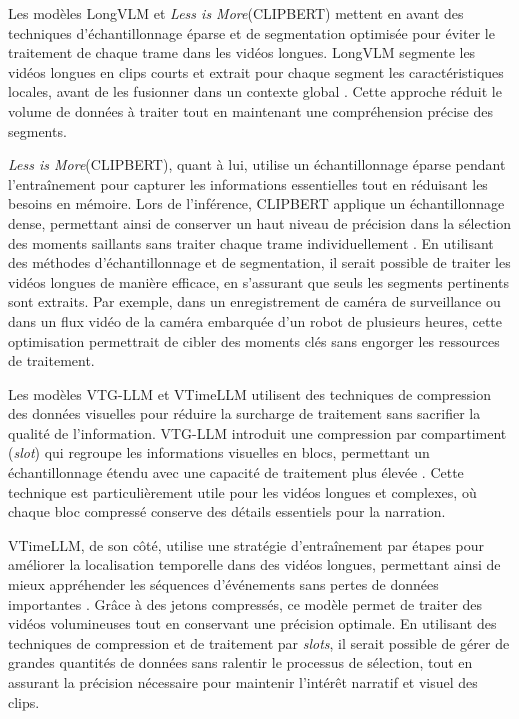 Les modèles LongVLM \cite{weng2024} et \textit{Less is More}(CLIPBERT) \cite{lei2021_clipbert} mettent en avant des techniques d’échantillonnage éparse et de segmentation optimisée pour éviter le traitement de chaque trame dans les vidéos longues. LongVLM segmente les vidéos longues en clips courts et extrait pour chaque segment les caractéristiques locales, avant de les fusionner dans un contexte global \cite{weng2024}. Cette approche réduit le volume de données à traiter tout en maintenant une compréhension précise des segments.

\textit{Less is More}(CLIPBERT), quant à lui, utilise un échantillonnage éparse pendant l’entraînement pour capturer les informations essentielles tout en réduisant les besoins en mémoire. Lors de l’inférence, CLIPBERT applique un échantillonnage dense, permettant ainsi de conserver un haut niveau de précision dans la sélection des moments saillants sans traiter chaque trame individuellement \cite{lei2021_clipbert}. En utilisant des méthodes d’échantillonnage et de segmentation, il serait possible de traiter les vidéos longues de manière efficace, en s’assurant que seuls les segments pertinents sont extraits. Par exemple, dans un enregistrement de caméra de surveillance ou dans un flux vidéo de la caméra embarquée d’un robot de plusieurs heures, cette optimisation permettrait de cibler des moments clés sans engorger les ressources de traitement.

Les modèles VTG-LLM \cite{guo2024_vtgLLM} et VTimeLLM \cite{huang2024_vtimeLLM} utilisent des techniques de compression des données visuelles pour réduire la surcharge de traitement sans sacrifier la qualité de l’information. VTG-LLM introduit une compression par compartiment  (\textit{slot}) qui regroupe les informations visuelles en blocs, permettant un échantillonnage étendu avec une capacité de traitement plus élevée \cite{guo2024_vtgLLM}. Cette technique est particulièrement utile pour les vidéos longues et complexes, où chaque bloc compressé conserve des détails essentiels pour la narration.

VTimeLLM, de son côté, utilise une stratégie d’entraînement par étapes pour améliorer la localisation temporelle dans des vidéos longues, permettant ainsi de mieux appréhender les séquences d’événements sans pertes de données importantes \cite{huang2024_vtimeLLM}. Grâce à des jetons compressés, ce modèle permet de traiter des vidéos volumineuses tout en conservant une précision optimale. En utilisant des techniques de compression et de traitement par \textit{slots}, il serait possible de gérer de grandes quantités de données sans ralentir le processus de sélection, tout en assurant la précision nécessaire pour maintenir l’intérêt narratif et visuel des clips.

